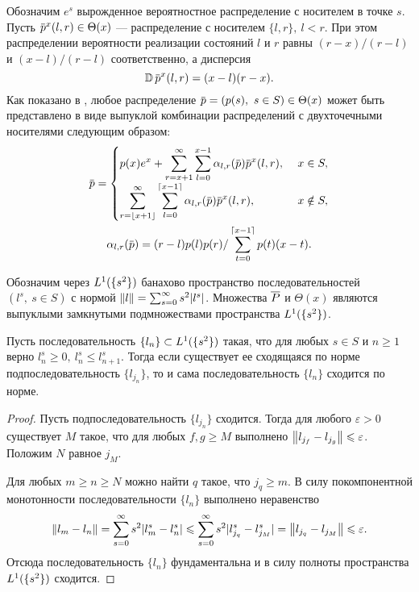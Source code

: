 {Обозначим $e^s$ вырожденное вероятностное распределение с носителем в точке $s$.
Пусть $\pd^x(l, r) \in \Theta(x)$ --- распределение с носителем $\{l, r\},\ l<r$.
При этом распределении вероятности реализации состояний $l$ и $r$ равны $(r-x)/(r-l)$ и $(x-l)/(r-l)$ соответственно, а дисперсия
\[
  \D \pd^x(l, r) = (x - l)(r - x).
\]
Как показано в \cite{domansky11}, любое распределение $\pd = (\pc{s},\ s \in S) \in \Theta(x)$ может быть представлено в виде выпуклой комбинации распределений с двухточечными носителями следующим образом:
\begin{gather}
  \label{ch2:lower-bound:eq:prob-decomp-sum}
  \pd = \begin{cases}
    \displaystyle
    \pc{x} e^x + \sum_{r=x+1}^\infty \sum_{l=0}^{x-1} \alpha_{l,r}(\pd) \pd^x(l, r),\ & x \in S,\\
    \displaystyle
    \sum_{r=\floor{x+1}}^\infty \sum_{l=0}^{\ceil{x-1}} \alpha_{l,r}(\pd) \pd^x(l, r),\ & x \notin S,\\
  \end{cases}\\
  \alpha_{l,r}(\pd) = (r-l) \pc{l} \pc{r} / \sum_{t=0}^{\ceil{x-1}} \pc{t} (x-t). \nonumber
\end{gather}

Обозначим через $L^1(\{s^2\})$ банахово пространство последовательностей $(l^s,\ s \in S)$ с нормой $\left\lVert l\right\rVert = \sum_{s = 0}^\infty s^2 |l^s|$.
Множества $\overline{P}$ и $\Theta(x)$ являются выпуклыми замкнутыми подмножествами пространства $L^1(\{s^2\})$.

\begin{lemma}
  \label{ch2:lower-bound:lemma:subseq-convergence}
  Пусть последовательность $\{l_n\} \subset L^1(\{s^2\})$ такая, что для любых $s \in S$ и $n \geqslant 1$ верно $l_n^s \geqslant 0,\ l_n^s \leqslant l_{n+1}^s$.
  Тогда если существует ее сходящаяся по норме подпоследовательность $\{l_{j_n}\}$, то и сама последовательность $\{l_n\}$ сходится по норме.
\end{lemma}
\begin{proof}
  Пусть подпоследовательность $\{l_{j_n}\}$ сходится.
  Тогда для любого $\varepsilon > 0$ существует $M$ такое, что для любых $f, g \geqslant M$ выполнено 
  $\left\lVert l_{j_f} - l_{j_g}\right\rVert \leqslant \varepsilon$.
  Положим $N$ равное $j_M$.
  
  Для любых $m \geqslant n \geqslant N$ можно найти $q$ такое, что $j_q \geqslant m$.
  В силу покомпонентной монотонности последовательности $\{l_n\}$ выполнено неравенство
  \begin{gather*}
    \left\lVert l_m - l_n\right\rVert =
    \sum_{s=0}^\infty s^2 |l_m^s - l_n^s| \leqslant
    \sum_{s=0}^\infty s^2 |l_{j_q}^s - l_{j_M}^s| =
    \left\lVert l_{j_q} - l_{j_M}\right\rVert \leqslant \varepsilon.
  \end{gather*}
  Отсюда последовательность $\{l_n\}$ фундаментальна и в силу полноты пространства $L^1(\{s^2\})$ сходится.
\end{proof}

}

